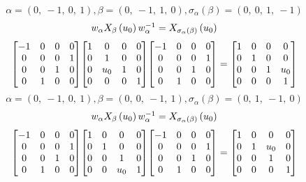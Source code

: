 \documentclass[11pt]{article}
\theoremstyle{definition}
\begin{document}
\[
\alpha = \left( 0, \  -1, \  0, \  1\right), \beta = \left( 0, \  -1, \  1, \  0\right), \sigma_{\alpha}(\beta) = \left( 0, \  0, \  1, \  -1\right)
\]
\[
\scaletoalign{\textwidth}{w_{\alpha} X_{\beta}\left(u_{0}\right) w_{\alpha}^{-1} = X_{\sigma_{\alpha}\left(\beta\right)}\left(u_{0}\right)}
\]
\[
\scaletoalign{\textwidth}{{\left[\begin{matrix}-1 & 0 & 0 & 0\\0 & 0 & 0 & 1\\0 & 0 & 1 & 0\\0 & 1 & 0 & 0\end{matrix}\right]} {\left[\begin{matrix}1 & 0 & 0 & 0\\0 & 1 & 0 & 0\\0 & u_{0} & 1 & 0\\0 & 0 & 0 & 1\end{matrix}\right]} {\left[\begin{matrix}-1 & 0 & 0 & 0\\0 & 0 & 0 & 1\\0 & 0 & 1 & 0\\0 & 1 & 0 & 0\end{matrix}\right]} = {\left[\begin{matrix}1 & 0 & 0 & 0\\0 & 1 & 0 & 0\\0 & 0 & 1 & u_{0}\\0 & 0 & 0 & 1\end{matrix}\right]}}
\]
\[
\alpha = \left( 0, \  -1, \  0, \  1\right), \beta = \left( 0, \  0, \  -1, \  1\right), \sigma_{\alpha}(\beta) = \left( 0, \  1, \  -1, \  0\right)
\]
\[
\scaletoalign{\textwidth}{w_{\alpha} X_{\beta}\left(u_{0}\right) w_{\alpha}^{-1} = X_{\sigma_{\alpha}\left(\beta\right)}\left(u_{0}\right)}
\]
\[
\scaletoalign{\textwidth}{{\left[\begin{matrix}-1 & 0 & 0 & 0\\0 & 0 & 0 & 1\\0 & 0 & 1 & 0\\0 & 1 & 0 & 0\end{matrix}\right]} {\left[\begin{matrix}1 & 0 & 0 & 0\\0 & 1 & 0 & 0\\0 & 0 & 1 & 0\\0 & 0 & u_{0} & 1\end{matrix}\right]} {\left[\begin{matrix}-1 & 0 & 0 & 0\\0 & 0 & 0 & 1\\0 & 0 & 1 & 0\\0 & 1 & 0 & 0\end{matrix}\right]} = {\left[\begin{matrix}1 & 0 & 0 & 0\\0 & 1 & u_{0} & 0\\0 & 0 & 1 & 0\\0 & 0 & 0 & 1\end{matrix}\right]}}
\]
\end{document}
